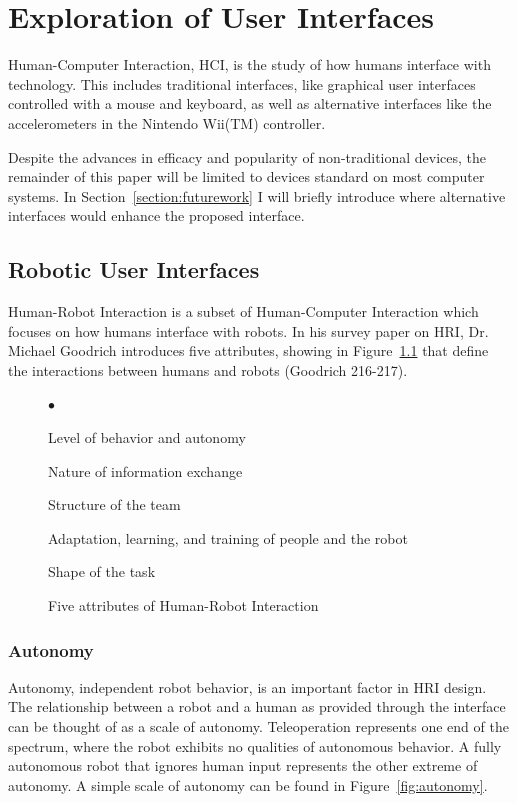 \chapter{Exploration of User Interfaces}
\label{chapter:ui}

Human-Computer Interaction, HCI, is the study of how humans interface with technology. This includes traditional interfaces, like graphical user interfaces controlled with a mouse and keyboard, as well as alternative interfaces like the accelerometers in the Nintendo Wii(TM) controller.

Despite the advances in efficacy and popularity of non-traditional devices, the remainder of this paper will be limited to devices standard on most computer systems. In Section~\ref{section:futurework} I will briefly introduce where alternative interfaces would enhance the proposed interface.

\section{Robotic User Interfaces}

Human-Robot Interaction is a subset of Human-Computer Interaction which focuses on how humans interface with robots. In his survey paper on HRI, Dr. Michael Goodrich introduces five attributes, showing in Figure~\ref{fig:five-attributes} that define the interactions between humans and robots (Goodrich 216-217).

\begin{figure}[ht]
	\makebox[\textwidth]{\hrulefill}
	\begin{list}{$\bullet$}
		\item Level of behavior and autonomy
		\item Nature of information exchange
		\item Structure of the team
		\item Adaptation, learning, and training of people and the robot
		\item Shape of the task
	\end{list}
	\makebox[\textwidth]{\hrulefill}
	\caption{Five attributes of Human-Robot Interaction \label{fig:five-attributes}}
\end{figure}


\subsection{Autonomy}

Autonomy, independent robot behavior, is an important factor in HRI design. The relationship between a robot and a human as provided through the interface can be thought of as a scale of autonomy. Teleoperation represents one end of the spectrum, where the robot exhibits no qualities of autonomous behavior. A fully autonomous robot that ignores human input represents the other extreme of autonomy. A simple scale of autonomy can be found in Figure~\ref{fig:autonomy}.

